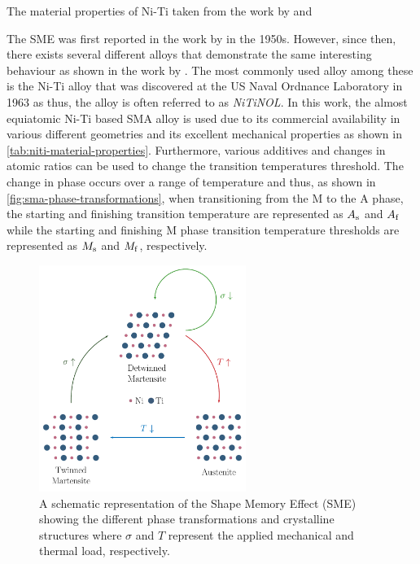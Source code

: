 \begin{table}[hbt]
    \centering
    \caption[The material properties of Ni-Ti]{The material properties of Ni-Ti taken from the work by \cite{duerigTiNiShapeMemory1994} and \cite{raoDesignShapeMemory2015}}
    \label{tab:niti-material-properties}
    
\end{table}

The SME was first reported in the work by \cite{changPlasticDeformationDiffusionless1951} in the 1950s. However, since then, there exists several different alloys that demonstrate the same interesting behaviour as shown in the work by \cite{WAYMAN19903}. The most commonly used alloy among these is the Ni-Ti alloy that was discovered at the US Naval Ordnance Laboratory in 1963 as thus, the alloy is often referred to as \textit{NiTiNOL}. In this work, the almost equiatomic Ni-Ti based SMA alloy is used due to its commercial availability in various different geometries and its excellent mechanical properties as shown in \cref{tab:niti-material-properties}. Furthermore, various additives and changes in atomic ratios can be used to change the transition temperatures threshold. The change in phase occurs over a range of temperature and thus, as shown in \cref{fig:sma-phase-transformations}, when transitioning from the M to the A phase, the starting and finishing transition temperature are represented as $A_\mathrm{s}$ and $A_\mathrm{f}$ while the starting and finishing M phase transition temperature thresholds are represented as $M_\mathrm{s}$ and $M_\mathrm{f}$, respectively.

\begin{figure}[hbt]
    \centering
    \includegraphics[width=0.6\textwidth]{images/chap2/sma-phases.pdf}
    \caption[A schematic representation of the Shape Memory Effect (SME) showing the different phase transformations and crystalline structures]{A schematic representation of the Shape Memory Effect (SME) showing the different phase transformations and crystalline structures where $\sigma$ and $T$ represent the applied mechanical and thermal load, respectively.}
    \label{fig:sma-phases}
\end{figure}

